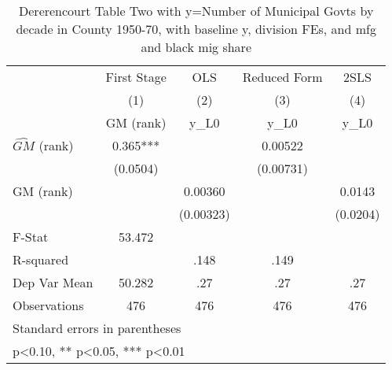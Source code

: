 \begin{table}[htbp]\centering
\def\sym#1{\ifmmode^{#1}\else\(^{#1}\)\fi}
\caption{Dererencourt Table Two with y=Number of Municipal Govts by decade in County 1950-70, with baseline y, division FEs, and mfg and black mig share}
\begin{tabular}{l*{4}{c}}
\toprule
                    & First Stage   &         OLS   &Reduced Form   &        2SLS   \\
                    &\multicolumn{1}{c}{(1)}&\multicolumn{1}{c}{(2)}&\multicolumn{1}{c}{(3)}&\multicolumn{1}{c}{(4)}\\
                    &\multicolumn{1}{c}{GM  (rank)}&\multicolumn{1}{c}{y\_L0}&\multicolumn{1}{c}{y\_L0}&\multicolumn{1}{c}{y\_L0}\\
\midrule
$\hat{GM}$ (rank)   &       0.365***&               &     0.00522   &               \\
                    &    (0.0504)   &               &   (0.00731)   &               \\
\addlinespace
GM  (rank)          &               &     0.00360   &               &      0.0143   \\
                    &               &   (0.00323)   &               &    (0.0204)   \\
\midrule
F-Stat              &      53.472   &               &               &               \\
R-squared           &               &        .148   &        .149   &               \\
Dep Var Mean        &      50.282   &         .27   &         .27   &         .27   \\
Observations        &         476   &         476   &         476   &         476   \\
\bottomrule
\multicolumn{5}{l}{\footnotesize Standard errors in parentheses}\\
\multicolumn{5}{l}{\footnotesize * p<0.10, ** p<0.05, *** p<0.01}\\
\end{tabular}
\end{table}
